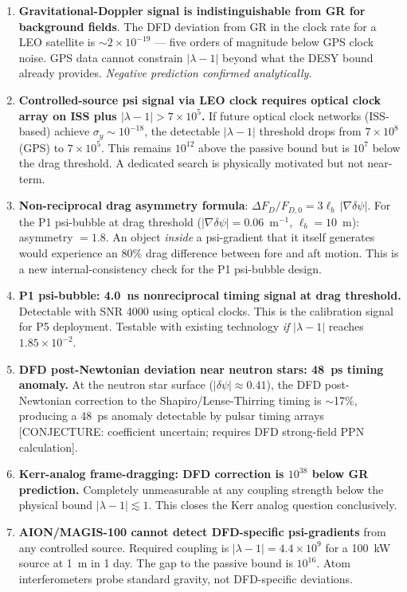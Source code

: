 \documentclass[11pt,twocolumn]{article}
\newcommand{\dpsi}{\delta\psi}
\newcommand{\lam}{\lambda}
\begin{document}
\begin{enumerate}[label=\textbf{P\arabic*.}, leftmargin=*, nosep, itemsep=4pt]

\item \textbf{Gravitational-Doppler signal is indistinguishable from GR
  for background fields}. The DFD deviation from GR in the clock rate
  for a LEO satellite is $\sim 2\times10^{-19}$ --- five orders of magnitude
  below GPS clock noise. GPS data cannot constrain $|\lam-1|$ beyond what
  the DESY bound already provides. \emph{Negative prediction confirmed
  analytically.}

\item \textbf{Controlled-source psi signal via LEO clock requires optical
  clock array on ISS plus $|\lam-1| > 7\times10^5$.} If future optical
  clock networks (ISS-based) achieve $\sigma_y \sim 10^{-18}$, the
  detectable $|\lam-1|$ threshold drops from $7\times10^8$ (GPS) to
  $7\times10^5$. This remains $10^{12}$ above the passive bound but is
  $10^7$ below the drag threshold. A dedicated search is physically
  motivated but not near-term.

\item \textbf{Non-reciprocal drag asymmetry formula}: $\Delta F_D/F_{D,0}
  = 3\ell_b\,|\nabla\dpsi|$. For the P1 psi-bubble at drag threshold
  ($|\nabla\dpsi| = 0.06$~m$^{-1}$, $\ell_b = 10$~m): asymmetry $= 1.8$.
  An object \emph{inside} a psi-gradient that it itself generates would
  experience an 80\% drag difference between fore and aft motion. This is
  a new internal-consistency check for the P1 psi-bubble design.

\item \textbf{P1 psi-bubble: 4.0~ns nonreciprocal timing signal at
  drag threshold.} Detectable with SNR 4000 using optical clocks. This is
  the calibration signal for P5 deployment. Testable with existing
  technology \emph{if} $|\lam-1|$ reaches $1.85\times10^{-2}$.

\item \textbf{DFD post-Newtonian deviation near neutron stars: 48~ps
  timing anomaly.} At the neutron star surface ($|\dpsi| \approx 0.41$),
  the DFD post-Newtonian correction to the Shapiro/Lense-Thirring timing
  is $\sim$17\%, producing a 48~ps anomaly detectable by pulsar timing
  arrays \textcolor{conjecturecolor}{[CONJECTURE: coefficient uncertain;
  requires DFD strong-field PPN calculation]}.

\item \textbf{Kerr-analog frame-dragging: DFD correction is $10^{38}$
  below GR prediction.} Completely unmeasurable at any coupling strength
  below the physical bound $|\lam-1| \lesssim 1$. This closes the Kerr
  analog question conclusively.

\item \textbf{AION/MAGIS-100 cannot detect DFD-specific psi-gradients}
  from any controlled source. Required coupling is $|\lam-1| = 4.4\times10^9$
  for a 100~kW source at 1~m in 1 day. The gap to the passive bound is
  $10^{16}$. Atom interferometers probe standard gravity, not DFD-specific
  deviations.

\end{enumerate}
\end{document}
